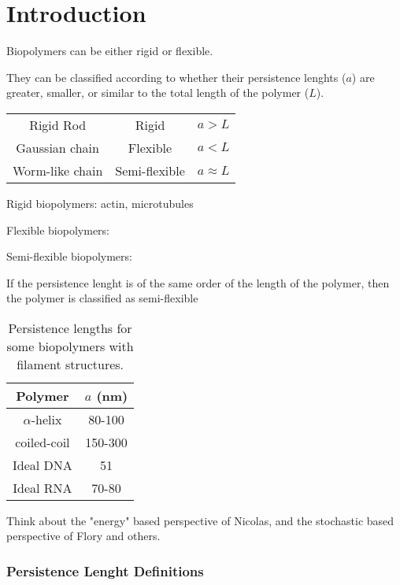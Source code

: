 \part{Introduction}
Biopolymers can be either rigid or flexible. 

They can be classified  according to whether their persistence lenghts ($a$)
are greater, smaller, or similar to the total length of the polymer ($L$).

\begin{table}[htbp]
\begin{center}  
\begin{tabular}{c|c|c}
\hline
Rigid Rod       & Rigid          &        $a > L$   \\
Gaussian chain  & Flexible       &        $a < L$   \\
Worm-like chain & Semi-flexible  &    $a \approx L$ \\
\hline
\end{tabular}
\end{center}
\end{table}

Rigid biopolymers:
actin, microtubules

Flexible biopolymers:

Semi-flexible biopolymers:

If the persistence lenght is of the same order of the length of the
polymer, then the polymer is classified as  semi-flexible


\begin{table}[htbp]
\begin{center}  
\begin{tabular}{c|c}
\hline
Polymer       & $a$ (nm)   \\ \hline
$\alpha$-helix & 80-100\\
coiled-coil & 150-300\\
Ideal DNA  &  51  \\
Ideal RNA & 70-80 \\
\hline
\end{tabular}
\caption{Persistence lengths for some biopolymers with filament structures.}
\end{center}
\end{table}

Think about the "energy" based perspective of Nicolas, and the
stochastic based perspective of Flory and others.




\section{Persistence Lenght Definitions}

